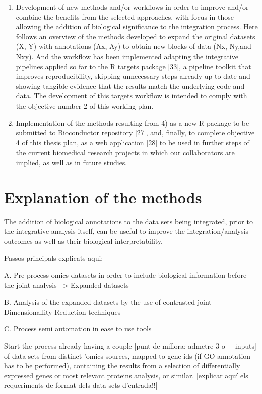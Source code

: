 \documentclass[a4paper, nobind]{templates/ociamthesis}
\begin{document}
\begin{enumerate}
\item
  Development of new methods and/or workflows in order to improve and/or combine the benefits from the selected approaches, with focus in those allowing the addition of biological significance to the integration process. Here follows an overview of the methods developed to expand the original datasets (X, Y) with annotations (Ax, Ay) to obtain new blocks of data (Nx, Ny,and Nxy). And the workflow has been implemented adapting the integrative pipelines applied so far to the R targets package {[}33{]}, a pipeline toolkit that improves reproducibility, skipping unnecessary steps already up to date and showing tangible evidence that the results match the underlying code and data. The development of this targets workflow is intended to comply with the objective number 2 of this working plan.
\item
  Implementation of the methods resulting from 4) as a new R package to be submitted to Bioconductor repository {[}27{]}, and, finally, to complete objective 4 of this thesis plan, as a web application {[}28{]} to be used in further steps of the current biomedical research projects in which our collaborators are implied, as well as in future studies.
\end{enumerate}

\hypertarget{explanation-of-the-methods}{%
\section{Explanation of the methods}\label{explanation-of-the-methods}}

The addition of biological annotations to the data sets being integrated, prior to the integrative analysis itself, can be useful to improve the integration/analysis outcomes as well as their biological interpretability.

Passos principals explicats aqui:

A. Pre process omics datasets in order to include biological information before the joint analysis --\textgreater{} Expanded datasets

B. Analysis of the expanded datasets by the use of contrasted joint Dimensionallity Reduction techniques

C. Process semi automation in ease to use tools

Start the process already having a couple {[}punt de millora: admetre 3 o + inputs{]} of data sets from distinct 'omics sources, mapped to gene ids (if GO annotation has to be performed), containing the results from a selection of differentially expressed genes or most relevant proteins analysis, or similar. {[}explicar aquí els requeriments de format dels data sets d'entrada!!{]}
\end{document}
